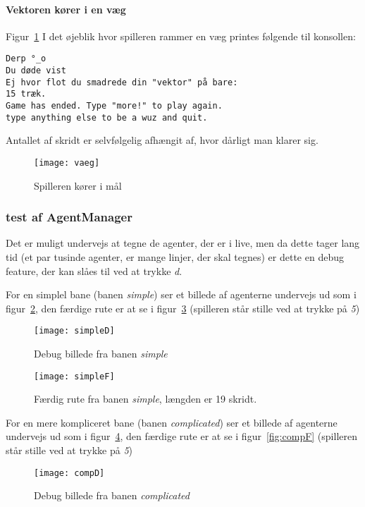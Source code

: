 \paragraph{Vektoren kører i en væg} Figur~\ref{fig:vaeg}
I det øjeblik hvor spilleren rammer en væg printes følgende til konsollen:
\begin{lstlisting}
Derp °_o
Du døde vist
Ej hvor flot du smadrede din "vektor" på bare:
15 træk.
Game has ended. Type "more!" to play again.
type anything else to be a wuz and quit.
\end{lstlisting}
Antallet af skridt er selvfølgelig afhængit af, hvor dårligt man klarer sig.
\begin{figure}[h!]
	\centering
	\texttt{[image: vaeg]}
		\caption{Spilleren kører i mål}\label{fig:vaeg}
\end{figure}

\subsubsection{test af AgentManager}
Det er muligt undervejs at tegne de agenter, der er i live, men da dette tager lang tid
(et par tusinde agenter, er mange linjer, der skal tegnes) er dette en debug feature, 
der kan slåes til ved at trykke \emph{d}.

For en simplel bane (banen \emph{simple}) ser et billede af agenterne undervejs ud som i figur~\ref{fig:simpleD},
den færdige rute er at se i figur~\ref{fig:simpleF} (spilleren står stille ved at trykke på \emph{5})

\begin{figure}[h!]
	\centering
	\texttt{[image: simpleD]}
		\caption{Debug billede fra banen \emph{simple}}\label{fig:simpleD}
\end{figure}

\begin{figure}[h!]
	\centering
	\texttt{[image: simpleF]}
		\caption{Færdig rute fra banen \emph{simple}, længden er 19 skridt.}\label{fig:simpleF}
\end{figure}

For en mere kompliceret bane (banen \emph{complicated}) ser et billede af agenterne undervejs ud som i figur~\ref{fig:compD},
den færdige rute er at se i figur~\ref{fig:compF} (spilleren står stille ved at trykke på \emph{5})

\begin{figure}[h!]
	\centering
	\texttt{[image: compD]}
		\caption{Debug billede fra banen \emph{complicated}}\label{fig:compD}
\end{figure}

